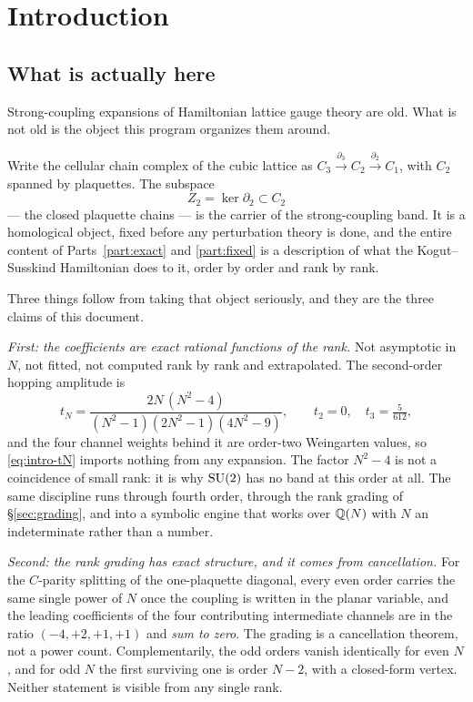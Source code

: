 \section{Introduction}
\label{sec:intro}

\subsection{What is actually here}

Strong-coupling expansions of Hamiltonian lattice gauge theory are old.
What is not old is the object this program organizes them around.

Write the cellular chain complex of the cubic lattice as
$C_3 \xrightarrow{\partial_3} C_2 \xrightarrow{\partial_2} C_1$, with
$C_2$ spanned by plaquettes. The subspace
\begin{equation}
  Z_2 = \ker \partial_2 \subset C_2
\end{equation}
--- the closed plaquette chains --- is the carrier of the strong-coupling
band. It is a homological object, fixed before any perturbation theory
is done, and the entire content of Parts~\ref{part:exact} and
\ref{part:fixed} is a description of what the Kogut--Susskind Hamiltonian
does to it, order by order and rank by rank.

Three things follow from taking that object seriously, and they are the
three claims of this document.

\emph{First: the coefficients are exact rational functions of the rank.}
Not asymptotic in $N$, not fitted, not computed rank by rank and
extrapolated. The second-order hopping amplitude is
\begin{equation}
  t_N = \frac{2N\,(N^2-4)}{(N^2-1)(2N^2-1)(4N^2-9)},
  \qquad t_2 = 0, \quad t_3 = \tfrac{5}{612},
  \label{eq:intro-tN}
\end{equation}
and the four channel weights behind it are order-two Weingarten values,
so \eqref{eq:intro-tN} imports nothing from any expansion. The factor
$N^2-4$ is not a coincidence of small rank: it is why $\mathrm{SU}(2)$ has no
band at this order at all. The same discipline runs through fourth
order, through the rank grading of \S\ref{sec:grading}, and into a
symbolic engine that works over $\mathbb{Q}(N)$ with $N$ an indeterminate rather
than a number.

\emph{Second: the rank grading has exact structure, and it comes from
cancellation.} For the $C$-parity splitting of the one-plaquette
diagonal, every even order carries the same single power of $N$ once the
coupling is written in the planar variable, and the leading coefficients
of the four contributing intermediate channels are in the ratio
$(-4, +2, +1, +1)$ and \emph{sum to zero}. The grading is a cancellation
theorem, not a power count. Complementarily, the odd orders vanish
identically for even $N$, and for odd $N$ the first surviving one is
order $N-2$, with a closed-form vertex. Neither statement is visible from
any single rank.

